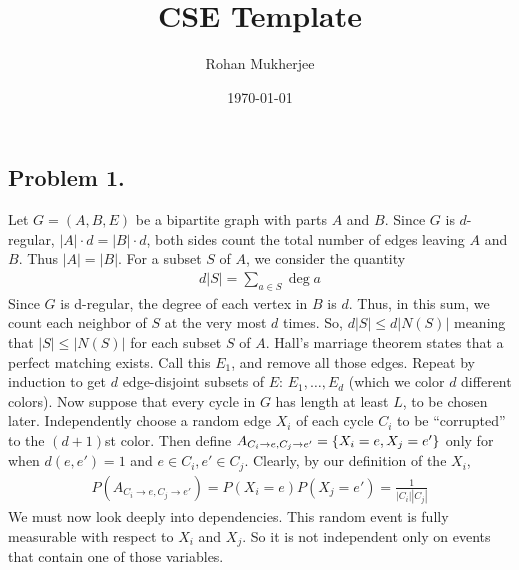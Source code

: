 \documentclass[12pt]{article}
\title{CSE Template}
\date{\today}
\author{Rohan Mukherjee}
\newcommand{\SET}[1]{\Set{\mskip-\medmuskip #1 \mskip-\medmuskip}}
\begin{document}
    \maketitle
    \subsection*{Problem 1.}
    Let $G = (A,B,E)$ be a bipartite graph with parts $A$ and $B$. Since $G$ is $d$-regular, $|A| \cdot d = |B| \cdot d$, both sides count the total number of edges leaving $A$ and $B$. Thus $|A| = |B|$. For a subset $S$ of $A$, we consider the quantity
    \begin{align*}
        d |S| = \sum_{a \in S} \deg a
    \end{align*}
    Since $G$ is d-regular, the degree of each vertex in $B$ is $d$. Thus, in this sum, we count each neighbor of $S$ at the very most $d$ times. So, $d|S| \leq d|N(S)|$ meaning that $|S| \leq |N(S)|$ for each subset $S$ of $A$. Hall's marriage theorem states that a perfect matching exists. Call this $E_1$, and remove all those edges. Repeat by induction to get $d$ edge-disjoint subsets of $E$: $E_1, \ldots, E_d$ (which we color $d$ different colors). Now suppose that every cycle in $G$ has length at least $L$, to be chosen later. Independently choose a random edge $X_i$ of each cycle $C_i$ to be ``corrupted'' to the $(d+1)$st color. Then define $A_{C_i \to e, C_j \to e'} = \SET{X_i = e, X_j = e'}$ only for when $d(e,e') = 1$ and $e \in C_i, e' \in C_j$. Clearly, by our definition of the $X_i$,
    \begin{align*}
        P(A_{C_i \to e, C_j \to e'}) = P(X_i = e) P(X_j = e') = \frac{1}{|C_i||C_j|}
    \end{align*}
    We must now look deeply into dependencies. This random event is fully measurable with respect to $X_i$ and $X_j$. So it is not independent only on events that contain one of those variables.
    
\end{document}
